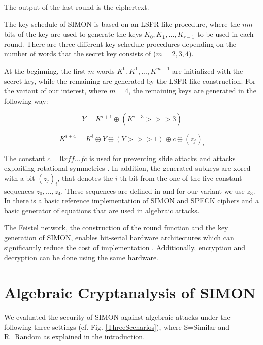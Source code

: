 The output of the last round is the ciphertext.

The key schedule of SIMON is based on an LSFR-like procedure, where the $nm$-bits of the key are used to generate the keys $K_0,K_1,...,K_{r-1}$ to be used in each round. There are three different key schedule procedures depending on the number of words that the secret key consists of ($m=2,3,4$).

At the beginning, the first $m$ words $K^0,K^1,...,K^{m-1}$ are initialized with the secret key, while the remaining are generated by the LSFR-like construction. For the variant of our interest, where $m=4$, the remaining keys are generated in the following way:

\begin{equation}
Y=K^{i+1}\oplus (K^{i+3}>>>3)
\end{equation}

\begin{equation}
K^{i+4}=K^i\oplus Y \oplus (Y>>>1)\oplus c\oplus (z_j)_i
\end{equation}

The constant $c=0xff...fc$ is used for preventing slide attacks and attacks exploiting rotational symmetries \cite{NSAciphers}. In addition, the generated subkeys are xored with a bit $(z_j)_i$, that denotes the $i$-th bit from the one of the five constant sequences $z_0,...,z_4$. These sequences are defined in \cite{NSAciphers} and for our variant we use $z_3$. In \cite{simonref} there is a basic reference implementation of SIMON and SPECK ciphers and a basic generator of equations that are used in algebraic attacks.

The Feistel network, the construction of the round function and the key generation of SIMON, enables bit-serial hardware architectures which can significantly reduce the cost of implementation \cite{simoneff}. Additionally, encryption and decryption can be done using the
same hardware.
\section{Algebraic Cryptanalysis of SIMON}

We evaluated the security of SIMON against algebraic attacks under the following
three settings (cf. Fig. \ref{ThreeScenarios}), where S=Similar and R=Random
as explained in the introduction.

